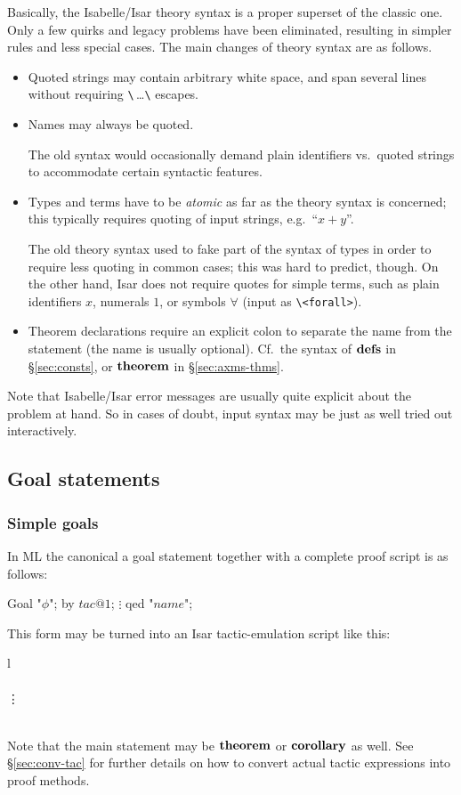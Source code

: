 Basically, the Isabelle/Isar theory syntax is a proper superset of the classic
one.  Only a few quirks and legacy problems have been eliminated, resulting in
simpler rules and less special cases.  The main changes of theory syntax are
as follows.

\begin{itemize}
\item Quoted strings may contain arbitrary white space, and span several lines
  without requiring \verb,\,\,\dots\verb,\, escapes.
\item Names may always be quoted.

  The old syntax would occasionally demand plain identifiers vs.\ quoted
  strings to accommodate certain syntactic features.
\item Types and terms have to be \emph{atomic} as far as the theory syntax is
  concerned; this typically requires quoting of input strings, e.g.\ ``$x +
  y$''.

  The old theory syntax used to fake part of the syntax of types in order to
  require less quoting in common cases; this was hard to predict, though.  On
  the other hand, Isar does not require quotes for simple terms, such as plain
  identifiers $x$, numerals $1$, or symbols $\forall$ (input as
  \verb,\<forall>,).
\item Theorem declarations require an explicit colon to separate the name from
  the statement (the name is usually optional).  Cf.\ the syntax of ${\mathord{\mathbf{defs}}}$ in
  \S\ref{sec:consts}, or ${\mathord{\mathbf{theorem}}}$ in \S\ref{sec:axms-thms}.
\end{itemize}

Note that Isabelle/Isar error messages are usually quite explicit about the
problem at hand.  So in cases of doubt, input syntax may be just as well tried
out interactively.


\subsection{Goal statements}\label{sec:conv-goal}

\subsubsection{Simple goals}

In ML the canonical a goal statement together with a complete proof script is
as follows:
\begin{ttbox}
 Goal "\(\phi\)";
 by \(tac@1\);
   \(\vdots\)
 qed "\(name\)";
\end{ttbox}
This form may be turned into an Isar tactic-emulation script like this:
\begin{matharray}{l}
   \\
  \quad {} \\
  \qquad \vdots \\
  \quad \DONE \\
\end{matharray}
Note that the main statement may be ${\mathord{\mathbf{theorem}}}$ or ${\mathord{\mathbf{corollary}}}$ as
well.  See \S\ref{sec:conv-tac} for further details on how to convert actual
tactic expressions into proof methods.


